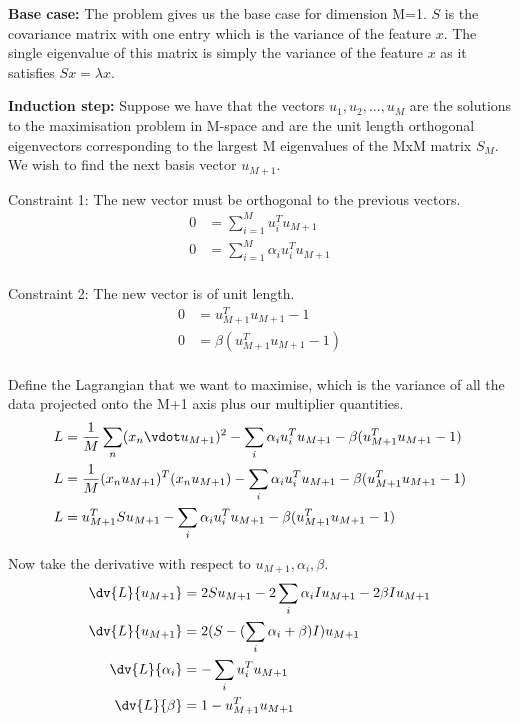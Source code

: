 \documentclass[newpage]{homework}
\begin{document}
\maketitle


\question

\textbf{Base case:} The problem gives us the base case for dimension M=1. $S$ is the covariance matrix with one entry which is the variance of the feature $x$. The single eigenvalue of this matrix is simply the variance of the feature $x$ as it satisfies $Sx = \lambda x$.

\textbf{Induction step:} Suppose we have that the vectors $u_1, u_2, ..., u_M$ are the solutions to the maximisation problem in M-space and are the unit length orthogonal eigenvectors corresponding to the largest M eigenvalues of the MxM matrix $S_M$. We wish to find the next basis vector $u_{M+1}$.

Constraint 1: The new vector must be orthogonal to the previous vectors.
\begin{align*}
    0	&=  \sum_{i=1}^M    u_i^T u_{M+1}   \\
    0	&=  \sum_{i=1}^M    \alpha_i u_i^T u_{M+1}   \\
\end{align*}

Constraint 2: The new vector is of unit length.
\begin{align*}
    0	&=	u_{M+1}^T u_{M+1} - 1	\\
    0	&=	\beta (u_{M+1}^T u_{M+1} - 1)	\\
\end{align*}

Define the Lagrangian that we want to maximise, which is the variance of all the data projected onto the M+1 axis plus our multiplier quantities.
\begin{align*}
    L	&=	\frac{1}{M} \sum_n  (x_n \vdot u_{M+1})^2
         -  \sum_i        \alpha_i u_i^T u_{M+1}
         -  \beta (u_{M+1}^T u_{M+1} - 1)   \\
    L	&=	\frac{1}{M} (x_n u_{M+1})^T (x_n u_{M+1})
         -  \sum_i        \alpha_i u_i^T u_{M+1}
         -  \beta (u_{M+1}^T u_{M+1} - 1)   \\
    L	&=	u_{M+1}^T S u_{M+1}
         -  \sum_i        \alpha_i u_i^T u_{M+1}
         -  \beta (u_{M+1}^T u_{M+1} - 1)   \\
\end{align*}

Now take the derivative with respect to $u_{M+1}, \alpha_i, \beta$.
\begin{align*}
    \dv{L}{u_{M+1}}	&=	2Su_{M+1} - 2 \sum_i \alpha_i I u_{M+1} - 2\beta Iu_{M+1}	\\
    \dv{L}{u_{M+1}}	&=	2(S - (\sum_i \alpha_i + \beta)I)u_{M+1}   \\
    \dv{L}{\alpha_i}    &=  - \sum_i u_i^T u_{M+1}    \\
    \dv{L}{\beta}   &=  1 - u_{M+1}^T u_{M+1}
\end{align*}
\end{document}
